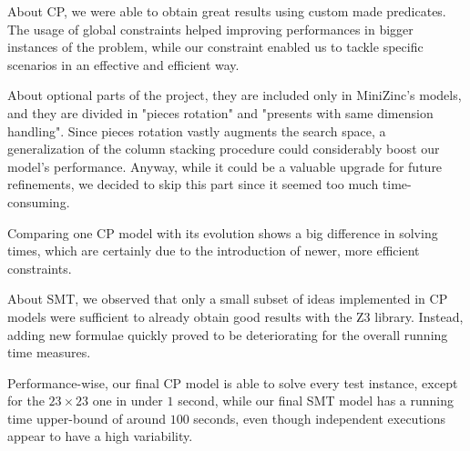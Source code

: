 \documentclass[a4paper,10pt]{article}
\begin{document}
About CP, we were able to obtain great results using custom made predicates. The usage of global constraints helped improving performances in bigger instances of the problem, while our  constraint enabled us to tackle specific scenarios in an effective and efficient way.

About optional parts of the project, they are included only in MiniZinc's models, and they are divided in "pieces rotation" and "presents with same dimension handling". 
Since pieces rotation vastly augments the search space, a generalization of the column stacking procedure could considerably boost our model's performance. Anyway, while it could be a valuable upgrade for future refinements, we decided to skip this part since it seemed too much time-consuming.

Comparing one CP model with its evolution shows a big difference in solving times, which are certainly due to the introduction of newer, more efficient constraints.

About SMT, we observed that only a small subset of ideas implemented in CP models were sufficient to already obtain good results with the Z3 library. Instead, adding new formulae quickly proved to be deteriorating for the overall running time measures.

Performance-wise, our final CP model is able to solve every test instance, except for the $23 \times 23$ one in under $1$ second, while our final SMT model has a running time upper-bound of around $100$ seconds, even though independent executions appear to have a high variability. 


\printbibliography
\end{document}
